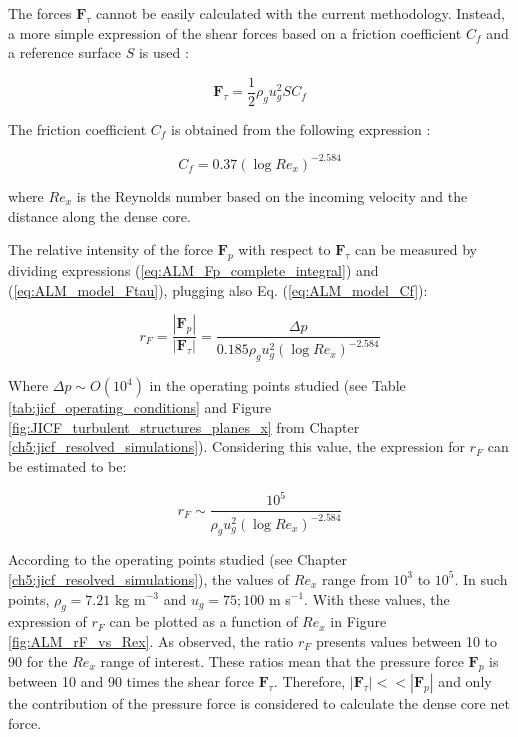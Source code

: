 The forces $\boldsymbol{F}_\tau$ cannot be easily calculated with the current methodology. Instead, a more simple expression of the shear forces based on a friction coefficient $C_f$ and a reference surface $S$ is used :

\begin{equation}
\label{eq:ALM_model_Ftau}
\boldsymbol{F}_\tau = \frac{1}{2} \rho_g u_g^2 S C_f 
\end{equation}

The friction coefficient $C_f$ is obtained from the following expression :

\begin{equation}
\label{eq:ALM_model_Cf}
C_f = 0.37 \left( \log Re_x \right)^{-2.584}
\end{equation}

where $Re_x$ is the Reynolds number based on the incoming velocity and the distance along the dense core.


The relative intensity of the force $\boldsymbol{F}_p$ with respect to $\boldsymbol{F}_\tau$ can be measured by dividing expressions (\ref{eq:ALM_Fp_complete_integral}) and (\ref{eq:ALM_model_Ftau}), plugging also Eq. (\ref{eq:ALM_model_Cf}):

\begin{equation}
\label{eq:rF_definition}
r_F = \frac{| \boldsymbol{F}_p| }{| \boldsymbol{F}_\tau |} = \frac{\Delta p}{0.185 \rho_g u_g^2 \left( \log Re_x \right)^{-2.584}}
\end{equation}


Where $\Delta p \sim O \left( 10^4 \right) $ in the operating points studied (see Table \ref{tab:jicf_operating_conditions} and Figure \ref{fig:JICF_turbulent_structures_planes_x} from Chapter \ref{ch5:jicf_resolved_simulations}). Considering this value, the expression for $r_F$ can be estimated to be:

\begin{equation}
r_F \sim \frac{10^5}{\rho_g u_g^2 \left( \log Re_x \right)^{-2.584}}
\end{equation}

According to the operating points studied (see Chapter \ref{ch5:jicf_resolved_simulations}), the values of $Re_x$ range from $10^3$ to $10^5$. In such points, $\rho_g = 7.21$ kg m$^{-3}$ and $u_g = 75; 100$ m s$^{-1}$. With these values, the expression of $r_F$ can be plotted as a function of $Re_x$ in Figure \ref{fig:ALM_rF_vs_Rex}. As observed, the ratio $r_F$ presents values between 10 to 90 for the $Re_x$ range of interest. These ratios mean that the pressure force $\boldsymbol{F}_p$ is between 10 and 90 times the shear force $\boldsymbol{F}_\tau$. Therefore, $|\boldsymbol{F}_\tau| << |\boldsymbol{F}_p|$ and only the contribution of the pressure force is considered to calculate the dense core net force.




